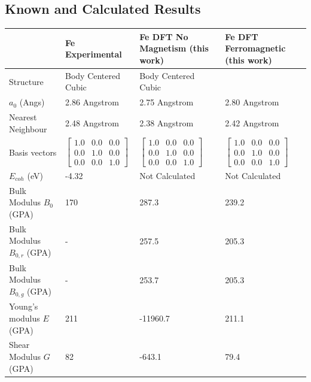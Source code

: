 



\clearpage
\begin{landscape}
\subsection{Known and Calculated Results}
\renewcommand{\arraystretch}{1.7}
\begin{table}[ht]
\renewcommand{\arraystretch}{1.2}
\begin{tabular}{llll}
\hline\hline
& Fe Experimental & Fe DFT No Magnetism (this work)  & Fe DFT Ferromagnetic (this work) \\
\hline\hline
Structure                    & Body Centered Cubic & Body Centered Cubic  \\
$a_0$ (Angs)                 & 2.86 Angstrom\cite{femendelev} & 2.75 Angstrom & 2.80 Angstrom \\
Nearest Neighbour            & 2.48 Angstrom\cite{femendelev} & 2.38 Angstrom & 2.42 Angstrom \\
Basis vectors                & $\begin{bmatrix} 1.0 & 0.0 & 0.0 \\ 0.0 & 1.0 & 0.0 \\ 0.0 & 0.0 & 1.0 \end{bmatrix}$ & $\begin{bmatrix} 1.0 & 0.0 & 0.0 \\ 0.0 & 1.0 & 0.0 \\ 0.0 & 0.0 & 1.0 \end{bmatrix}$  & $\begin{bmatrix} 1.0 & 0.0 & 0.0 \\ 0.0 & 1.0 & 0.0 \\ 0.0 & 0.0 & 1.0 \end{bmatrix}$\\
$E_{coh}$ (eV)               & -4.32 \cite{femendelev}&  Not Calculated  &  Not Calculated\\
Bulk Modulus $B_0$ (GPA)     & 170  &  287.3    & 239.2 \\
Bulk Modulus $B_{0,r}$ (GPA) & -    &  257.5    & 205.3 \\
Bulk Modulus $B_{0,g}$ (GPA) & -    &  253.7    & 205.3 \\
Young's modulus $E$ (GPA)    & 211  &  -11960.7 & 211.1 \\
Shear Modulus $G$ (GPA)      & 82   &  -643.1   & 79.4 \\

\end{tabular}
\end{table}
\end{landscape}
